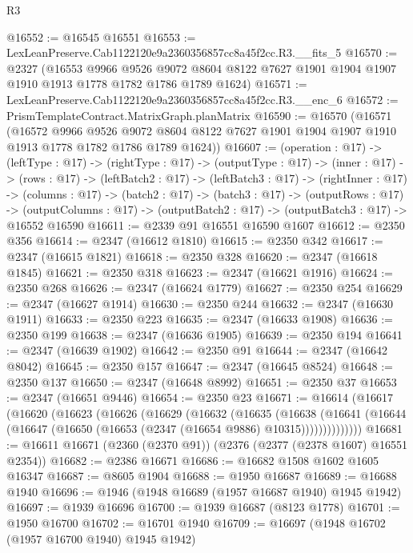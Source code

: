\begin{lexlean}{R3}
\begin{coremodule}
@16552 := @16545 @16551
@16553 := LexLeanPreserve.Cab1122120e9a2360356857cc8a45f2cc.R3.__fits_5
@16570 := @2327
    (@16553
      @9966
      @9526
      @9072
      @8604
      @8122
      @7627
      @1901
      @1904
      @1907
      @1910
      @1913
      @1778
      @1782
      @1786
      @1789
      @1624)
@16571 := LexLeanPreserve.Cab1122120e9a2360356857cc8a45f2cc.R3.__enc_6
@16572 := PrismTemplateContract.MatrixGraph.planMatrix
@16590 := @16570
    (@16571
      (@16572
        @9966
        @9526
        @9072
        @8604
        @8122
        @7627
        @1901
        @1904
        @1907
        @1910
        @1913
        @1778
        @1782
        @1786
        @1789
        @1624))
@16607 := (operation : @17) ->
  (leftType : @17) ->
  (rightType : @17) ->
  (outputType : @17) ->
  (inner : @17) ->
  (rows : @17) ->
  (leftBatch2 : @17) ->
  (leftBatch3 : @17) ->
  (rightInner : @17) ->
  (columns : @17) ->
  (batch2 : @17) ->
  (batch3 : @17) ->
  (outputRows : @17) ->
  (outputColumns : @17) -> (outputBatch2 : @17) -> (outputBatch3 : @17) -> @16552 @16590
@16611 := @2339 @91 @16551 @16590 @1607
@16612 := @2350 @356
@16614 := @2347 (@16612 @1810)
@16615 := @2350 @342
@16617 := @2347 (@16615 @1821)
@16618 := @2350 @328
@16620 := @2347 (@16618 @1845)
@16621 := @2350 @318
@16623 := @2347 (@16621 @1916)
@16624 := @2350 @268
@16626 := @2347 (@16624 @1779)
@16627 := @2350 @254
@16629 := @2347 (@16627 @1914)
@16630 := @2350 @244
@16632 := @2347 (@16630 @1911)
@16633 := @2350 @223
@16635 := @2347 (@16633 @1908)
@16636 := @2350 @199
@16638 := @2347 (@16636 @1905)
@16639 := @2350 @194
@16641 := @2347 (@16639 @1902)
@16642 := @2350 @91
@16644 := @2347 (@16642 @8042)
@16645 := @2350 @157
@16647 := @2347 (@16645 @8524)
@16648 := @2350 @137
@16650 := @2347 (@16648 @8992)
@16651 := @2350 @37
@16653 := @2347 (@16651 @9446)
@16654 := @2350 @23
@16671 := @16614
    (@16617
      (@16620
        (@16623
          (@16626
            (@16629
              (@16632
                (@16635
                  (@16638
                    (@16641
                      (@16644 (@16647 (@16650 (@16653 (@2347 (@16654 @9886) @10315))))))))))))))
@16681 := @16611 @16671 (@2360 (@2370 @91)) (@2376 (@2377 (@2378 @1607) @16551 @2354))
@16682 := @2386 @16671
@16686 := @16682 @1508 @1602 @1605 @16347
@16687 := @8605 @1904
@16688 := @1950 @16687
@16689 := @16688 @1940
@16696 := @1946 (@1948 @16689 (@1957 @16687 @1940) @1945 @1942)
@16697 := @1939 @16696
@16700 := @1939 @16687 (@8123 @1778)
@16701 := @1950 @16700
@16702 := @16701 @1940
@16709 := @16697 (@1948 @16702 (@1957 @16700 @1940) @1945 @1942)

\end{coremodule}
\end{lexlean}
